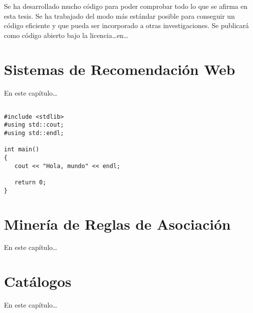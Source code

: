 Se ha desarrollado mucho código para poder comprobar todo lo que se afirma en esta tesis. Se ha trabajado del modo más estándar posible para conseguir un código eficiente y que pueda ser incorporado a otras investigaciones. Se publicará como código abierto bajo la licencia\ldots en\ldots




\section{Sistemas de Recomendación Web}
En este capítulo\ldots

\begin{verbatim}

#include <stdlib>
#using std::cout;
#using std::endl;

int main()
{
   cout << "Hola, mundo" << endl;
   
   return 0;
}
\end{verbatim}


%
%
%   



\section{Minería de Reglas de Asociación}
En este capítulo\ldots




\section{Catálogos}
En este capítulo\ldots




